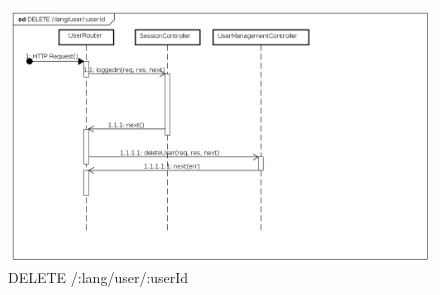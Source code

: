 \begin{itemize}
\label{Fallimento della procedura di eliminazione account}
\begin{figure}[ht]
	\centering
	\includegraphics[scale=0.40]{UML/DiagrammiDiSequenza/Back-end/DELETE_LangUserUseridFailure.png}
	\caption{DELETE /:lang/user/:userId}
\end{figure}

\FloatBarrier
\end{itemize}

